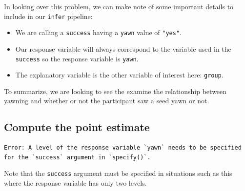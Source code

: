 \documentclass[12pt, krantz2,]{krantz}
\makeatletter
\newenvironment{Shaded}{\begin{snugshade}}{\end{snugshade}}
\newcommand{\DataTypeTok}[1]{\textcolor[rgb]{0.27,0.27,0.27}{#1}}
\newcommand{\KeywordTok}[1]{\textcolor[rgb]{0.27,0.27,0.27}{\textbf{#1}}}
\newcommand{\NormalTok}[1]{#1}
\newcommand{\OperatorTok}[1]{\textcolor[rgb]{0.43,0.43,0.43}{\textbf{#1}}}
\newcommand{\StringTok}[1]{\textcolor[rgb]{0.5,0.5,0.5}{#1}}
\providecommand{\tightlist}{%
  \setlength{\itemsep}{0pt}\setlength{\parskip}{0pt}}
\newenvironment{kframe}{%
\medskip{}
\setlength{\fboxsep}{.8em}
 \def\at@end@of@kframe{}%
 \ifinner\ifhmode%
  \def\at@end@of@kframe{\end{minipage}}%
  \begin{minipage}{\columnwidth}%
 \fi\fi%
 \def\FrameCommand##1{\hskip\@totalleftmargin \hskip-\fboxsep
 \colorbox{shadecolor}{##1}\hskip-\fboxsep
     \hskip-\linewidth \hskip-\@totalleftmargin \hskip\columnwidth}%
 \MakeFramed {\advance\hsize-\width
   \@totalleftmargin\z@ \linewidth\hsize
   \@setminipage}}%
 {\par\unskip\endMakeFramed%
 \at@end@of@kframe}
\renewenvironment{Shaded}{\begin{kframe}}{\end{kframe}}
\makeatother
\begin{document}
In looking over this problem, we can make note of some important details to include in our \texttt{infer} pipeline:

\begin{itemize}
\tightlist
\item
  We are calling a \texttt{success} having a \texttt{yawn} value of \texttt{"yes"}.
\item
  Our response variable will always correspond to the variable used in the \texttt{success} so the response variable is \texttt{yawn}.
\item
  The explanatory variable is the other variable of interest here: \texttt{group}.
\end{itemize}

To summarize, we are looking to see the examine the relationship between yawning and whether or not the participant saw a seed yawn or not.

\hypertarget{compute-the-point-estimate}{%
\subsection{Compute the point estimate}\label{compute-the-point-estimate}}

\begin{Shaded}
\end{Shaded}

\begin{verbatim}
Error: A level of the response variable `yawn` needs to be specified for the `success` argument in `specify()`.
\end{verbatim}

Note that the \texttt{success} argument must be specified in situations such as this where the response variable has only two levels.

\begin{Shaded}
\end{Shaded}
\end{document}
